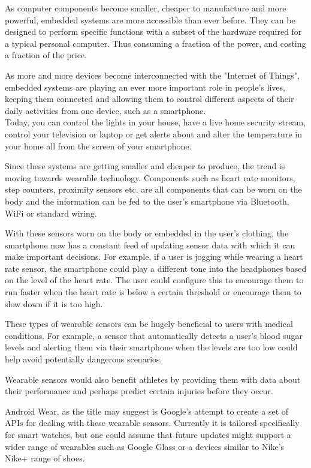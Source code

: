 
As computer components become smaller, cheaper to manufacture and more powerful,
embedded systems are more accessible than ever before. They can be designed to
perform specific functions with a subset of the hardware required for a typical
personal computer. Thus consuming a fraction of the power, and costing a fraction
of the price.

As more and more devices become interconnected with the "Internet of Things",
embedded systems are playing an ever more important role in people's lives,
keeping them connected and allowing them to control different aspects of their
daily activities from one device, such as a smartphone.\\
Today, you can control the lights in your house, have a live home security
stream, control your television or laptop or get alerts about and alter the
temperature in your home all from the screen of your smartphone.

Since these systems are getting smaller and cheaper to produce, the trend is
moving towards wearable technology. Components such as heart rate monitors,
step counters, proximity sensors etc. are all components that can be worn on
the body and the information can be fed to the user's smartphone via Bluetooth,
WiFi or standard wiring.

With these sensors worn on the body or embedded in the user's clothing, the 
smartphone now has a constant feed of updating sensor data with which it can
make important decisions. For example, if a user is jogging while wearing a
heart rate sensor, the smartphone could play a different tone into the
headphones based on the level of the heart rate. The user could configure this
to encourage them to run faster when the heart rate is below a certain
threshold or encourage them to slow down if it is too high.

These types of wearable sensors can be hugely beneficial to users with medical
conditions. For example, a sensor that automatically detects a user's blood
sugar levels and alerting them via their smartphone when the levels are too
low could help avoid potentially dangerous scenarios.

Wearable sensors would also benefit athletes by providing them with data about
their performance and perhaps predict certain injuries before they occur.

Android Wear, as the title may suggest is Google's attempt to create a set of
APIs for dealing with these wearable sensors. Currently it is tailored
specifically for smart watches, but one could assume that future updates might
support a wider range of wearables such as Google Glass or a devices similar to
Nike's Nike+ range of shoes.

